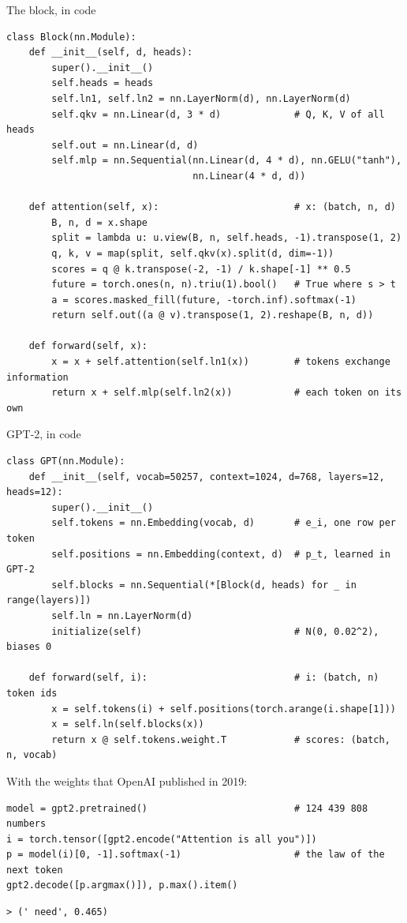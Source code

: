 \documentclass[10pt]{beamer}
\begin{document}
\begin{frame}[fragile]{The block, in code}
\begin{lstlisting}
class Block(nn.Module):
    def __init__(self, d, heads):
        super().__init__()
        self.heads = heads
        self.ln1, self.ln2 = nn.LayerNorm(d), nn.LayerNorm(d)
        self.qkv = nn.Linear(d, 3 * d)             # Q, K, V of all heads
        self.out = nn.Linear(d, d)
        self.mlp = nn.Sequential(nn.Linear(d, 4 * d), nn.GELU("tanh"),
                                 nn.Linear(4 * d, d))

    def attention(self, x):                        # x: (batch, n, d)
        B, n, d = x.shape
        split = lambda u: u.view(B, n, self.heads, -1).transpose(1, 2)
        q, k, v = map(split, self.qkv(x).split(d, dim=-1))
        scores = q @ k.transpose(-2, -1) / k.shape[-1] ** 0.5
        future = torch.ones(n, n).triu(1).bool()   # True where s > t
        a = scores.masked_fill(future, -torch.inf).softmax(-1)
        return self.out((a @ v).transpose(1, 2).reshape(B, n, d))

    def forward(self, x):
        x = x + self.attention(self.ln1(x))        # tokens exchange information
        return x + self.mlp(self.ln2(x))           # each token on its own
\end{lstlisting}
\end{frame}


\begin{frame}[fragile]{GPT-2, in code}
\begin{lstlisting}
class GPT(nn.Module):
    def __init__(self, vocab=50257, context=1024, d=768, layers=12, heads=12):
        super().__init__()
        self.tokens = nn.Embedding(vocab, d)       # e_i, one row per token
        self.positions = nn.Embedding(context, d)  # p_t, learned in GPT-2
        self.blocks = nn.Sequential(*[Block(d, heads) for _ in range(layers)])
        self.ln = nn.LayerNorm(d)
        initialize(self)                           # N(0, 0.02^2), biases 0

    def forward(self, i):                          # i: (batch, n) token ids
        x = self.tokens(i) + self.positions(torch.arange(i.shape[1]))
        x = self.ln(self.blocks(x))
        return x @ self.tokens.weight.T            # scores: (batch, n, vocab)
\end{lstlisting}
\small
With the weights that OpenAI published in 2019:
\begin{lstlisting}[belowskip=2pt]
model = gpt2.pretrained()                          # 124 439 808 numbers
i = torch.tensor([gpt2.encode("Attention is all you")])
p = model(i)[0, -1].softmax(-1)                    # the law of the next token
gpt2.decode([p.argmax()]), p.max().item()
\end{lstlisting}
\begin{lstlisting}[style=output]
> (' need', 0.465)
\end{lstlisting}
\end{frame}
\end{document}
